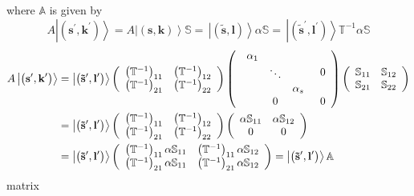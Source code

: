 \documentclass[aps,preprint]{revtex4}%
\begin{document}
where $\mathbb{A}$ is given by
\begin{equation}
A\left|  \left(  \mathbf{s}^{\prime}\mathbf{,k}^{\prime}\right)  \right\rangle
=A\left|  \left(  \mathbf{s,k}\right)  \right\rangle \mathbb{S=\,}\left|
\left(  \mathbf{\tilde{s},l}\right)  \right\rangle \mathbb{\alpha S=\,}\left|
\left(  \mathbf{\tilde{s}}^{\prime}\mathbf{,l}^{\prime}\right)  \right\rangle
\mathbb{T}^{-1}\mathbb{\alpha S}%
\end{equation}
\begin{align}
A\left|  \left(  \mathbf{s}^{\prime}\mathbf{,k}^{\prime}\right)
\right\rangle  & =\left|  \left(  \mathbf{\tilde{s}}^{\prime}\mathbf{,l}%
^{\prime}\right)  \right\rangle \left(
\begin{array}
[c]{cc}%
\left(  \mathbb{T}^{-1}\right)  _{11} & \left(  \mathbb{T}^{-1}\right)
_{12}\\
\left(  \mathbb{T}^{-1}\right)  _{21} & \left(  \mathbb{T}^{-1}\right)  _{22}%
\end{array}
\right)  \left(
\begin{array}
[c]{cc}%
\begin{array}
[c]{ccc}%
\alpha_{1} &  & \\
& \ddots & \\
&  & \alpha_{s}%
\end{array}
& 0\\
0 & 0
\end{array}
\right)  \left(
\begin{array}
[c]{cc}%
\mathbb{S}_{11} & \mathbb{S}_{12}\\
\mathbb{S}_{21} & \mathbb{S}_{22}%
\end{array}
\right) \nonumber\\
& =\left|  \left(  \mathbf{\tilde{s}}^{\prime}\mathbf{,l}^{\prime}\right)
\right\rangle \left(
\begin{array}
[c]{cc}%
\left(  \mathbb{T}^{-1}\right)  _{11} & \left(  \mathbb{T}^{-1}\right)
_{12}\\
\left(  \mathbb{T}^{-1}\right)  _{21} & \left(  \mathbb{T}^{-1}\right)  _{22}%
\end{array}
\right)  \left(
\begin{array}
[c]{cc}%
\alpha\mathbb{S}_{11} & \alpha\mathbb{S}_{12}\\
0 & 0
\end{array}
\right) \nonumber\\
& =\left|  \left(  \mathbf{\tilde{s}}^{\prime}\mathbf{,l}^{\prime}\right)
\right\rangle \left(
\begin{array}
[c]{cc}%
\left(  \mathbb{T}^{-1}\right)  _{11}\alpha\mathbb{S}_{11} & \left(
\mathbb{T}^{-1}\right)  _{11}\alpha\mathbb{S}_{12}\\
\left(  \mathbb{T}^{-1}\right)  _{21}\alpha\mathbb{S}_{11} & \left(
\mathbb{T}^{-1}\right)  _{21}\alpha\mathbb{S}_{12}%
\end{array}
\right)  =\left|  \left(  \mathbf{\tilde{s}}^{\prime}\mathbf{,l}^{\prime
}\right)  \right\rangle \mathbb{A}%
\end{align}
matrix
\end{document}
